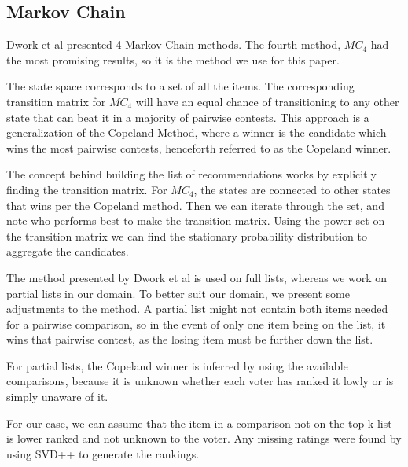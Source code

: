 \subsection{Markov Chain}\label{sec:markovchain}


Dwork et al presented 4 Markov Chain methods. The fourth method, $MC_{4}$ had the most promising results, so it is the method we use for this paper\cite{rank:aggregation}.

The state space corresponds to a set of all the items. The corresponding transition matrix for $MC_4$ will have an equal chance of transitioning to any other state that can beat it in a majority of pairwise contests. This approach is a generalization of the Copeland Method, where a winner is the candidate which wins the most pairwise contests, henceforth referred to as the Copeland winner.

The concept behind building the list of recommendations works by explicitly finding the transition matrix. For $MC_4$, the states are connected to other states that wins per the Copeland method. Then we can iterate through the set, and note who performs best to make the transition matrix. Using the power set on the transition matrix we can find the stationary probability distribution to aggregate the candidates.

The method presented by Dwork et al is used on full lists, whereas we work on partial lists in our domain. To better suit our domain, we present some adjustments to the method. A partial list might not contain both items needed for a pairwise comparison, so in the event of only one item being on the list, it wins that pairwise contest, as the losing item must be further down the list.

For partial lists, the Copeland winner is inferred by using the available comparisons, because it is unknown whether each voter has ranked it lowly or is simply unaware of it.

For our case, we can assume that the item in a comparison not on the top-k list is lower ranked and not unknown to the voter. Any missing ratings were found by using SVD++ to generate the rankings.

